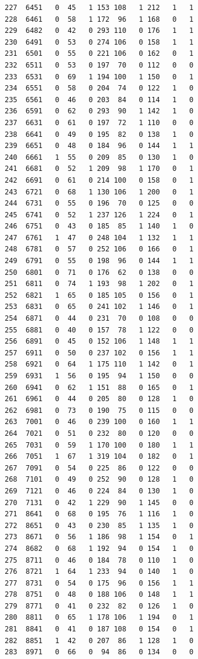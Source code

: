 \documentclass[
  letterpaper,
]{scrbook}
\begin{document}
\begin{verbatim}
227  6451   0  45   1 153 108   1 212   1   1
228  6461   0  58   1 172  96   1 168   0   1
229  6482   0  42   0 293 110   0 176   1   1
230  6491   0  53   0 274 106   0 158   1   1
231  6501   0  55   0 221 106   0 162   0   1
232  6511   0  53   0 197  70   0 112   0   0
233  6531   0  69   1 194 100   1 150   0   1
234  6551   0  58   0 204  74   0 122   1   0
235  6561   0  46   0 203  84   0 114   1   0
236  6591   0  62   0 293  90   1 142   1   0
237  6631   0  61   0 197  72   1 110   0   0
238  6641   0  49   0 195  82   0 138   1   0
239  6651   0  48   0 184  96   0 144   1   1
240  6661   1  55   0 209  85   0 130   1   0
241  6681   0  52   1 209  98   1 170   0   1
242  6691   0  61   0 214 100   0 158   0   1
243  6721   0  68   1 130 106   1 200   0   1
244  6731   0  55   0 196  70   0 125   0   0
245  6741   0  52   1 237 126   1 224   0   1
246  6751   0  43   0 185  85   1 140   1   0
247  6761   1  47   0 248 104   1 132   1   1
248  6781   0  57   0 252 106   0 166   0   1
249  6791   0  55   0 198  96   0 144   1   1
250  6801   0  71   0 176  62   0 138   0   0
251  6811   0  74   1 193  98   1 202   0   1
252  6821   1  65   0 185 105   0 156   0   1
253  6831   0  65   0 241 102   1 146   0   1
254  6871   0  44   0 231  70   0 108   0   0
255  6881   0  40   0 157  78   1 122   0   0
256  6891   0  45   0 152 106   1 148   1   1
257  6911   0  50   0 237 102   0 156   1   1
258  6921   0  64   1 175 110   1 142   0   1
259  6931   1  56   0 195  94   1 150   0   0
260  6941   0  62   1 151  88   0 165   0   1
261  6961   0  44   0 205  80   0 128   1   0
262  6981   0  73   0 190  75   0 115   0   0
263  7001   0  46   0 239 100   0 160   1   1
264  7021   0  51   0 232  80   0 120   0   0
265  7031   0  59   1 170 100   0 180   1   1
266  7051   1  67   1 319 104   0 182   0   1
267  7091   0  54   0 225  86   0 122   0   0
268  7101   0  49   0 252  90   0 128   1   0
269  7121   0  46   0 224  84   0 130   1   0
270  7131   0  42   1 229  90   1 145   0   0
271  8641   0  68   0 195  76   1 116   1   0
272  8651   0  43   0 230  85   1 135   1   0
273  8671   0  56   1 186  98   1 154   0   1
274  8682   0  68   1 192  94   0 154   1   0
275  8711   0  46   0 184  78   0 110   1   0
276  8721   1  64   1 233  94   0 140   1   0
277  8731   0  54   0 175  96   0 156   1   1
278  8751   0  48   0 188 106   0 148   1   1
279  8771   0  41   0 232  82   0 126   1   0
280  8811   0  65   1 178 106   1 194   0   1
281  8841   0  41   0 187 108   0 154   0   1
282  8851   1  42   0 207  86   1 128   1   0
283  8971   0  66   0  94  86   0 134   0   0

\end{verbatim}
\end{document}
